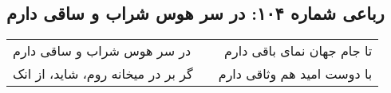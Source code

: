 \begin{center}
\section*{رباعی شماره ۱۰۴: در سر هوس شراب و ساقی دارم}
\label{sec:104}
\begin{longtable}{l p{0.5cm} r}
در سر هوس شراب و ساقی دارم
&&
تا جام جهان نمای باقی دارم
\\
گر بر در میخانه روم، شاید، از انک
&&
با دوست امید هم وثاقی دارم
\\
\end{longtable}
\end{center}
